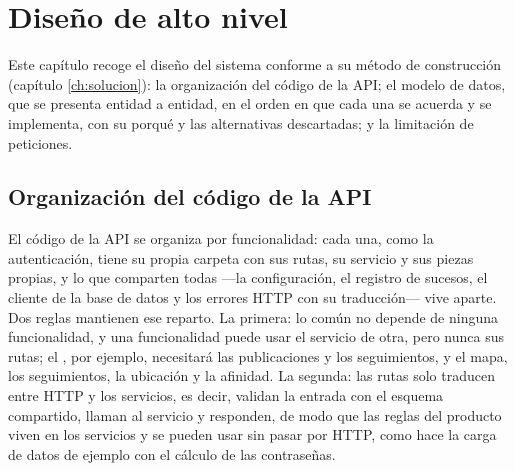 
\chapter{Diseño de alto nivel}
\label{ch:diseno}

Este capítulo recoge el diseño del sistema conforme a su método de construcción (capítulo \ref{ch:solucion}): la organización del código de la \ac{API}; el modelo de datos, que se presenta entidad a entidad, en el orden en que cada una se acuerda y se implementa, con su porqué y las alternativas descartadas; y la limitación de peticiones.

\section{Organización del código de la \acs{API}}
\label{sec:diseno-organizacion}

El código de la \ac{API} se organiza por funcionalidad: cada una, como la autenticación, tiene su propia carpeta con sus rutas, su servicio y sus piezas propias, y lo que comparten todas —la configuración, el registro de sucesos, el cliente de la base de datos y los errores \ac{HTTP} con su traducción— vive aparte.
Dos reglas mantienen ese reparto.
La primera: lo común no depende de ninguna funcionalidad, y una funcionalidad puede usar el servicio de otra, pero nunca sus rutas; el , por ejemplo, necesitará las publicaciones y los seguimientos, y el mapa, los seguimientos, la ubicación y la afinidad.
La segunda: las rutas solo traducen entre \ac{HTTP} y los servicios, es decir, validan la entrada con el esquema compartido, llaman al servicio y responden, de modo que las reglas del producto viven en los servicios y se pueden usar sin pasar por \ac{HTTP}, como hace la carga de datos de ejemplo con el cálculo de las contraseñas.

